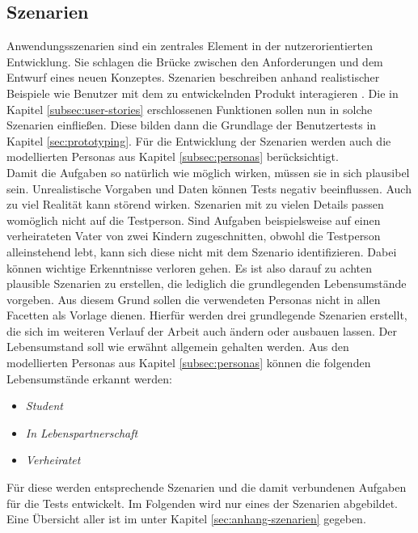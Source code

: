 \subsection{Szenarien}
\label{subsec:szenarien}
Anwendungsszenarien sind ein zentrales Element in der nutzerorientierten Entwicklung. Sie schlagen die Brücke zwischen den Anforderungen und dem Entwurf eines neuen Konzeptes. Szenarien beschreiben anhand realistischer Beispiele wie Benutzer mit dem zu entwickelnden Produkt interagieren \cite{richter-ux-compact}. Die in Kapitel \ref{subsec:user-stories} erschlossenen Funktionen sollen nun in solche Szenarien einfließen. Diese bilden dann die Grundlage der Benutzertests in Kapitel \ref{sec:prototyping}. Für die Entwicklung der Szenarien werden auch die modellierten Personas aus Kapitel \ref{subsec:personas} berücksichtigt.\\
Damit die Aufgaben so natürlich wie möglich wirken, müssen sie in sich plausibel sein. Unrealistische Vorgaben und Daten können Tests negativ beeinflussen. Auch zu viel Realität kann störend wirken. Szenarien mit zu vielen Details passen womöglich nicht auf die Testperson. Sind Aufgaben beispielsweise auf einen verheirateten Vater von zwei Kindern zugeschnitten, obwohl die Testperson alleinstehend lebt, kann sich diese nicht mit dem Szenario identifizieren. Dabei können wichtige Erkenntnisse verloren gehen. Es ist also darauf zu achten plausible Szenarien zu erstellen, die lediglich die grundlegenden Lebensumstände vorgeben. Aus diesem Grund sollen die verwendeten Personas nicht in allen Facetten als Vorlage dienen. Hierfür werden drei grundlegende Szenarien erstellt, die sich im weiteren Verlauf der Arbeit auch ändern oder ausbauen lassen. Der Lebensumstand soll wie erwähnt allgemein gehalten werden. Aus den modellierten Personas aus Kapitel \ref{subsec:personas} können die folgenden Lebensumstände erkannt werden:

\begin{itemize}
    \item\textit{Student}
    \item\textit{In Lebenspartnerschaft}
    \item\textit{Verheiratet}
\end{itemize}

Für diese werden entsprechende Szenarien und die damit verbundenen Aufgaben für die Tests entwickelt. Im Folgenden wird nur eines der Szenarien abgebildet. Eine Übersicht aller ist im  unter Kapitel \ref{sec:anhang-szenarien} gegeben.

